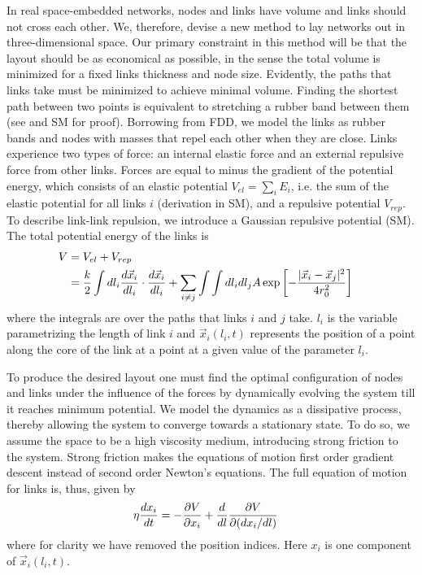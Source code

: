 \documentclass[nofootinbib,preprint,endfloats]{revtex4} %
\begin{document}
In real space-embedded networks, nodes and links have volume and links should not cross each other.
We, therefore, devise a new method to lay networks out in three-dimensional space. 
Our primary constraint in this method will be that the layout should be as economical as possible, in the sense the total volume is minimized for a fixed links thickness and node size. 
Evidently, the paths that links take must be minimized to achieve minimal volume. 
Finding the shortest path between two points is equivalent to stretching a rubber band between them (see \cite{novikov1984} and SM for proof).
Borrowing from FDD, we model the links as rubber bands 
and nodes with masses that repel each other when they are close. 
Links experience two types of force: an internal elastic force and an external repulsive force from other links.     
Forces are equal to minus the gradient of the potential energy,
which consists of an elastic potential $V_{el}= \sum_i E_i$, i.e. the sum of the elastic potential for all links $i$
(derivation in SM),
and a repulsive potential $V_{rep}$. 
To describe link-link repulsion, we introduce a Gaussian repulsive potential (SM). 
The total potential energy of the links is
\begin{align}
    V &= V_{el} + V_{rep} \cr 
    &= {k\over 2}\int dl_i {d\vec{x}_i\over dl_i} \cdot {d\vec{x}_i\over dl_i} + 
    \sum_{i\ne j} \int \int dl_idl_j 
    A \exp\left[- {|\vec{x}_i-\vec{x}_j|^2 \over 4 r_0^2}\right] \label{eq:Vfull}
\end{align}
where the integrals are over the paths that links $i$ and $j$ take. $l_i$ is the variable parametrizing the length of link $i$ and  $\vec{x}_i(l_i,t)$ represents the position of a point along the core of the link at a point at a given value of the parameter $l_i$.  

To produce the desired layout one must find the optimal configuration of nodes and links under the influence of the forces by dynamically evolving the system till it reaches minimum potential. 
We model the dynamics as a dissipative process, thereby allowing the system to converge towards a stationary state. 
To do so, we assume the space to be a high viscosity medium, introducing strong friction to the system.
Strong friction makes the equations of motion first order gradient descent instead of second order Newton's equations.
The full equation of motion for links is, thus, given by 
\begin{align}
    \eta {dx_i \over dt} & =  -{\partial V \over \partial x_i} + {d\over dl} {\partial V \over \partial (dx_i /dl)}   \label{eq:Langevin0}
\end{align}
where for clarity we have removed the position indices. Here $x_i$ is one component of $\vec{x}_i(l_i,t)$. 
\end{document}
